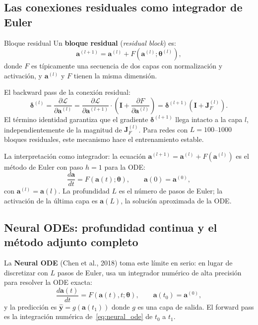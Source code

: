 \subsection{Las conexiones residuales como integrador de Euler}
\label{subsec:residual}

\begin{definicion}{Bloque residual}
\label{def:residual}
Un \textbf{bloque residual} (\textit{residual block}) es:
\[
  \bm{a}^{(l+1)} = \bm{a}^{(l)} + F(\bm{a}^{(l)};\bm{\theta}^{(l)}),
\]
donde $F$ es típicamente una secuencia de dos capas con normalización y
activación, y $\bm{a}^{(l)}$ y $F$ tienen la misma dimensión.
\end{definicion}

El backward pass de la conexión residual:
\[
  \bm{\delta}^{(l)} = \frac{\partial\mathcal{L}}{\partial\bm{a}^{(l)}}
  = \frac{\partial\mathcal{L}}{\partial\bm{a}^{(l+1)}}
  \cdot\left(\bm{I} + \frac{\partial F}{\partial\bm{a}^{(l)}}\right)
  = \bm{\delta}^{(l+1)}\left(\bm{I} + \bm{J}_F^{(l)}\right).
\]
El término identidad garantiza que el gradiente $\bm{\delta}^{(l+1)}$ llega
intacto a la capa $l$, independientemente de la magnitud de $\bm{J}_F^{(l)}$.
Para redes con $L = 100$--$1000$ bloques residuales, este mecanismo hace el
entrenamiento estable.

La interpretación como integrador: la ecuación
$\bm{a}^{(l+1)} = \bm{a}^{(l)} + F(\bm{a}^{(l)})$ es el método de Euler
con paso $h = 1$ para la ODE:
\[
  \frac{d\bm{a}}{dt} = F(\bm{a}(t);\bm{\theta}),
  \qquad \bm{a}(0) = \bm{a}^{(0)},
\]
con $\bm{a}^{(l)} = \bm{a}(l)$. La profundidad $L$ es el número de pasos
de Euler; la activación de la última capa es $\bm{a}(L)$, la solución
aproximada de la ODE.

\subsection{Neural ODEs: profundidad continua y el método adjunto completo}
\label{subsec:neural_ode}

La \textbf{Neural ODE} (Chen et al., 2018) toma este límite en serio: en lugar
de discretizar con $L$ pasos de Euler, usa un integrador numérico de alta
precisión para resolver la ODE exacta:
\begin{equation}
  \frac{d\bm{a}(t)}{dt} = F(\bm{a}(t), t;\bm{\theta}),
  \qquad \bm{a}(t_0) = \bm{a}^{(0)},
  \label{eq:neural_ode}
\end{equation}
y la predicción es $\hat{\bm{y}} = g(\bm{a}(t_1))$ donde $g$ es una capa de
salida. El forward pass es la integración numérica de~\eqref{eq:neural_ode}
de $t_0$ a $t_1$.

